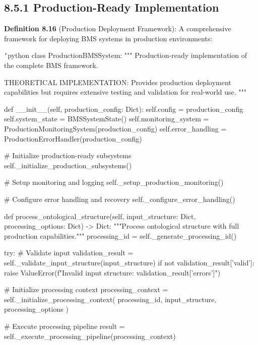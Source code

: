 \subsection{8.5.1 Production-Ready Implementation}

\textbf{Definition 8.16} (Production Deployment Framework): A comprehensive framework for deploying BMS systems in production environments:

\texttt{`}python
class ProductionBMSSystem:
    """
    Production-ready implementation of the complete BMS framework.
    
    THEORETICAL IMPLEMENTATION: Provides production deployment capabilities
    but requires extensive testing and validation for real-world use.
    """
    
    def __init__(self, production_config: Dict):
        self.config = production_config
        self.system_state = BMSSystemState()
        self.monitoring_system = ProductionMonitoringSystem(production_config)
        self.error_handling = ProductionErrorHandler(production_config)
        
        \# Initialize production-ready subsystems
        self._initialize_production_subsystems()
        
        \# Setup monitoring and logging
        self._setup_production_monitoring()
        
        \# Configure error handling and recovery
        self._configure_error_handling()
        
    def process_ontological_structure(self, input_structure: Dict, 
                                    processing_options: Dict) -> Dict:
        """Process ontological structure with full production capabilities."""
        processing_id = self._generate_processing_id()
        
        try:
            \# Validate input
            validation_result = self._validate_input_structure(input_structure)
            if not validation_result['valid']:
                raise ValueError(f"Invalid input structure: {validation_result['errors']}")
            
            \# Initialize processing context
            processing_context = self._initialize_processing_context(
                processing_id, input_structure, processing_options
            )
            
            \# Execute processing pipeline
            result = self._execute_processing_pipeline(processing_context)
            
